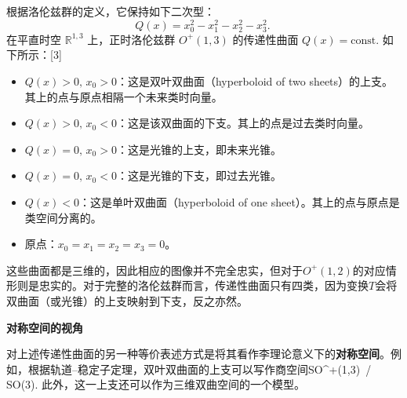 根据洛伦兹群的定义，它保持如下二次型：
\[
Q(x) = x_{0}^{2} - x_{1}^{2} - x_{2}^{2} - x_{3}^{2}.~
\]
在平直时空 $\mathbb{R}^{1,3}$ 上，正时洛伦兹群 $O^{+}(1,3)$ 的传递性曲面 $Q(x)=\text{const.}$ 如下所示：[3]
\begin{itemize}
  \item $Q(x) > 0,\, x_{0} > 0$：这是双叶双曲面（hyperboloid of two sheets）的上支。其上的点与原点相隔一个未来类时向量。
  \item $Q(x) > 0,\, x_{0} < 0$：这是该双曲面的下支。其上的点是过去类时向量。
  \item $Q(x) = 0,\, x_{0} > 0$：这是光锥的上支，即未来光锥。
  \item $Q(x) = 0,\, x_{0} < 0$：这是光锥的下支，即过去光锥。
  \item $Q(x) < 0$：这是单叶双曲面（hyperboloid of one sheet）。其上的点与原点是类空间分离的。
  \item 原点：$x_{0} = x_{1} = x_{2} = x_{3} = 0$。
\end{itemize}
这些曲面都是三维的，因此相应的图像并不完全忠实，但对于$O^{+}(1,2)$的对应情形则是忠实的。对于完整的洛伦兹群而言，传递性曲面只有四类，因为变换$T$会将双曲面（或光锥）的上支映射到下支，反之亦然。

\textbf{对称空间的视角}

对上述传递性曲面的另一种等价表述方式是将其看作李理论意义下的\textbf{对称空间}。例如，根据轨道–稳定子定理，双叶双曲面的上支可以写作商空间SO^{+}(1,3) \,/\, SO(3).
\]
此外，这一上支还可以作为三维双曲空间的一个模型。

